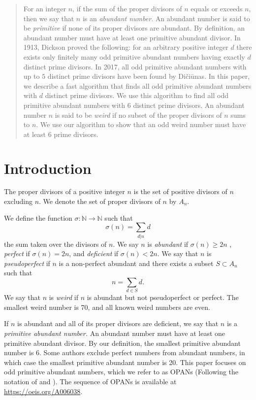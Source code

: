 \documentclass[../paper.tex]{article}
\begin{document}
\begin{abstract}
For an integer $n$, if the sum of the proper divisors of 
$n$ equals or exceeds $n$, then we say that $n$ is an 
\textit{abundant number}.  An abundant number is said to be 
\textit{primitive} if none of its proper divisors are abundant. 
By definition, an abundant number must have at least one primitive 
abundant divisor. In 1913, Dickson proved the following: 
for an arbitrary positive integer $d$ there exists only finitely 
many odd primitive abundant numbers having exactly $d$ distinct 
prime divisors. In 2017, all odd primitive abundant numbers with 
up to $5$ distinct prime divisors have been found by Di\v{c}i\={u}nas. 
In this paper, we 
describe a fast algorithm that finds all odd primitive abundant 
numbers with $d$ distinct prime divisors. We use this algorithm 
to find all odd primitive abundant numbers with $6$ distinct prime
divisors. An abundant number $n$ is said to be \textit{weird} if 
no subset of the proper divisors of $n$ sums to $n$. We use our 
algorithm to show that an odd weird number must have at least $6$
prime divisors.
\end{abstract}

\section{Introduction}
The proper divisors of a positive integer $n$ is the set of 
positive divisors of $n$ excluding $n$. We denote 
the set of proper divisors of $n$ by $\textit{A}_{n}$.

We define the function 
%
$\sigma: \mathbb{N} \rightarrow \mathbb{N}$
%
such that
%
$$\sigma(n) = \sum_{d|n}d$$
%
the sum taken over the divisors of $n$. We say $n$ is 
\textit{abundant} if $\sigma(n) \geq 2n$ \footnotemark
, \textit{perfect} if $\sigma(n) = 2n$, and \textit{deficient} if 
$\sigma(n) < 2n$. We say that $n$ is \textit{pseudoperfect} if 
$n$ is a non-perfect abundant and there exists a subset $ S 
\subset \textit{A}_{n}$ such that
%
%
%
$$ n = \sum_{d \in S} d .$$
%
We say that $n$ is \textit{weird} if $n$ is abundant but not 
pseudoperfect or perfect. The smallest weird number is 70, and 
all known weird numbers are even.

If $n$ is abundant and all of its proper divisors are deficient,
we say that $n$ is a \textit{primitive abundant number.} 
An abundant number must 
have at least one primitive abundant divisor. By our definition,
the smallest primitive abundant number is 6. Some authors exclude perfect
numbers from abundant numbers, in which case the smallest primitive abundant
number is 20. This paper focuses
on odd primitive abundant numbers, which we refer to as OPANs
(Following the notation of \cite{valdas} and \cite{amato}). The sequence 
of OPANs is available at \url{https://oeis.org/A006038}.\cite{oeis}
\end{document}
